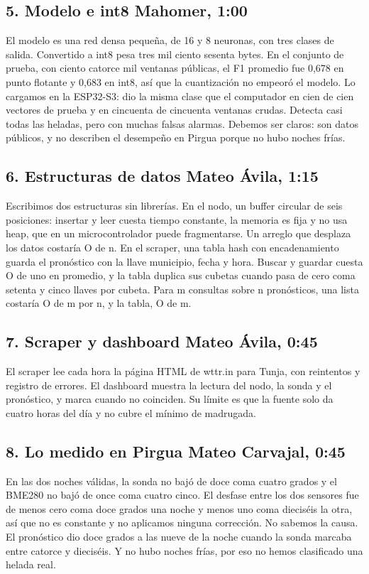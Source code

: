 \documentclass[11pt,a4paper]{article}
\begin{document}
\subsection*{5. Modelo e int8 \hfill \small Mahomer, 1:00}
El modelo es una red densa pequeña, de 16 y 8 neuronas, con tres clases de salida. Convertido a int8 pesa tres mil ciento sesenta bytes. En el conjunto de prueba, con ciento catorce mil ventanas públicas, el F1 promedio fue 0,678 en punto flotante y 0,683 en int8, así que la cuantización no empeoró el modelo. Lo cargamos en la ESP32-S3: dio la misma clase que el computador en cien de cien vectores de prueba y en cincuenta de cincuenta ventanas crudas. Detecta casi todas las heladas, pero con muchas falsas alarmas. Debemos ser claros: son datos públicos, y no describen el desempeño en Pirgua porque no hubo noches frías.

\subsection*{6. Estructuras de datos \hfill \small Mateo Ávila, 1:15}
Escribimos dos estructuras sin librerías. En el nodo, un buffer circular de seis posiciones: insertar y leer cuesta tiempo constante, la memoria es fija y no usa heap, que en un microcontrolador puede fragmentarse. Un arreglo que desplaza los datos costaría O de n. En el scraper, una tabla hash con encadenamiento guarda el pronóstico con la llave municipio, fecha y hora. Buscar y guardar cuesta O de uno en promedio, y la tabla duplica sus cubetas cuando pasa de cero coma setenta y cinco llaves por cubeta. Para m consultas sobre n pronósticos, una lista costaría O de m por n, y la tabla, O de m.

\subsection*{7. Scraper y dashboard \hfill \small Mateo Ávila, 0:45}
El scraper lee cada hora la página HTML de wttr.in para Tunja, con reintentos y registro de errores. El dashboard muestra la lectura del nodo, la sonda y el pronóstico, y marca cuando no coinciden. Su límite es que la fuente solo da cuatro horas del día y no cubre el mínimo de madrugada.

\subsection*{8. Lo medido en Pirgua \hfill \small Mateo Carvajal, 0:45}
En las dos noches válidas, la sonda no bajó de doce coma cuatro grados y el BME280 no bajó de once coma cuatro cinco. El desfase entre los dos sensores fue de menos cero coma doce grados una noche y menos uno coma dieciséis la otra, así que no es constante y no aplicamos ninguna corrección. No sabemos la causa. El pronóstico dio doce grados a las nueve de la noche cuando la sonda marcaba entre catorce y dieciséis. Y no hubo noches frías, por eso no hemos clasificado una helada real.
\end{document}
